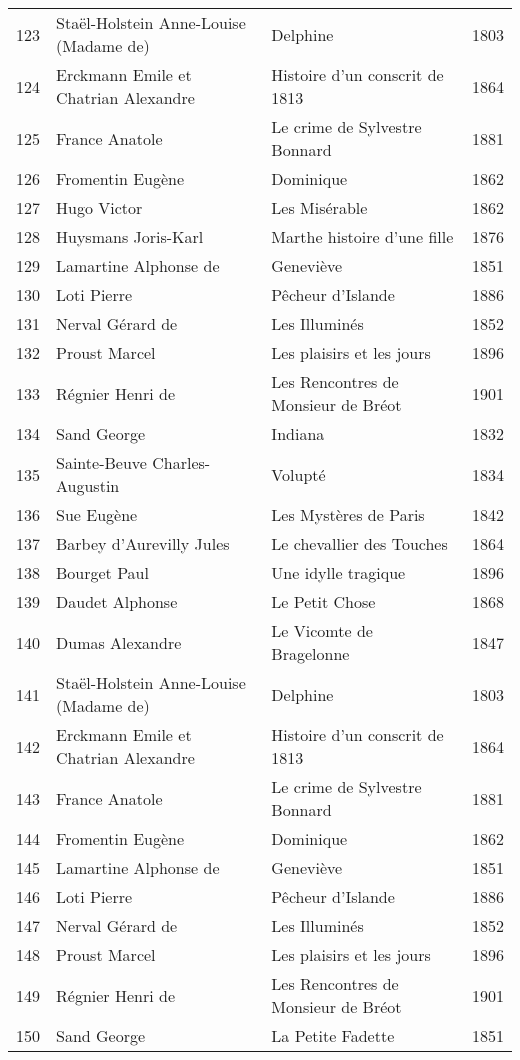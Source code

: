 \begin{table}[H]
\begin{tabular}{l l l l}
    123 & Staël-Holstein Anne-Louise (Madame de) & Delphine & 1803 \\
    124 & Erckmann Emile et Chatrian Alexandre & Histoire d’un conscrit de 1813 & 1864 \\
    125 & France Anatole & Le crime de Sylvestre Bonnard & 1881 \\
    126 & Fromentin Eugène & Dominique & 1862 \\
    127 & Hugo Victor & Les Misérable & 1862 \\
    128 & Huysmans Joris-Karl & Marthe histoire d’une fille & 1876 \\
    129 & Lamartine Alphonse de & Geneviève & 1851 \\
    130 & Loti Pierre & Pêcheur d’Islande & 1886 \\
    131 & Nerval Gérard de & Les Illuminés & 1852 \\
    132 & Proust Marcel & Les plaisirs et les jours & 1896 \\
    133 & Régnier Henri de & Les Rencontres de Monsieur de Bréot & 1901 \\
    134 & Sand George & Indiana & 1832 \\
    135 & Sainte-Beuve Charles-Augustin & Volupté & 1834 \\
    136 & Sue Eugène & Les Mystères de Paris & 1842 \\
    137 & Barbey d'Aurevilly Jules & Le chevallier des Touches & 1864 \\
    138 & Bourget Paul & Une idylle tragique & 1896 \\
    139 & Daudet Alphonse & Le Petit Chose & 1868 \\
    140 & Dumas Alexandre & Le Vicomte de Bragelonne & 1847 \\
    141 & Staël-Holstein Anne-Louise (Madame de) & Delphine & 1803 \\
    142 & Erckmann Emile et Chatrian Alexandre & Histoire d’un conscrit de 1813 & 1864 \\
    143 & France Anatole & Le crime de Sylvestre Bonnard & 1881 \\
    144 & Fromentin Eugène & Dominique & 1862 \\
    145 & Lamartine Alphonse de & Geneviève & 1851 \\
    146 & Loti Pierre & Pêcheur d’Islande & 1886 \\
    147 & Nerval Gérard de & Les Illuminés & 1852 \\
    148 & Proust Marcel & Les plaisirs et les jours & 1896 \\
    149 & Régnier Henri de & Les Rencontres de Monsieur de Bréot & 1901 \\
    150 & Sand George & La Petite Fadette & 1851 \\
    \bottomrule
  \end{tabular}
\end{table}

